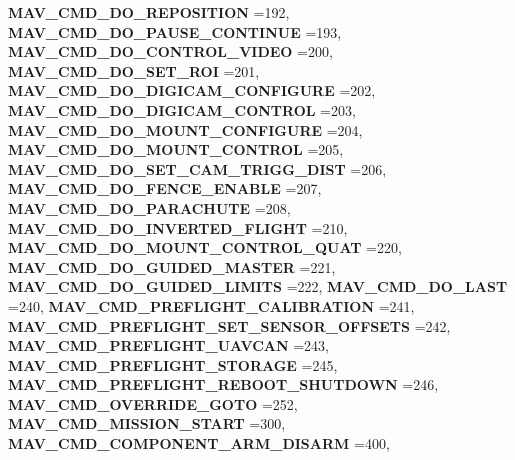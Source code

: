 \begin{DoxyCompactItemize}
\textbf{ M\+A\+V\+\_\+\+C\+M\+D\+\_\+\+D\+O\+\_\+\+R\+E\+P\+O\+S\+I\+T\+I\+ON} =192, 
\newline
\textbf{ M\+A\+V\+\_\+\+C\+M\+D\+\_\+\+D\+O\+\_\+\+P\+A\+U\+S\+E\+\_\+\+C\+O\+N\+T\+I\+N\+UE} =193, 
\textbf{ M\+A\+V\+\_\+\+C\+M\+D\+\_\+\+D\+O\+\_\+\+C\+O\+N\+T\+R\+O\+L\+\_\+\+V\+I\+D\+EO} =200, 
\textbf{ M\+A\+V\+\_\+\+C\+M\+D\+\_\+\+D\+O\+\_\+\+S\+E\+T\+\_\+\+R\+OI} =201, 
\textbf{ M\+A\+V\+\_\+\+C\+M\+D\+\_\+\+D\+O\+\_\+\+D\+I\+G\+I\+C\+A\+M\+\_\+\+C\+O\+N\+F\+I\+G\+U\+RE} =202, 
\newline
\textbf{ M\+A\+V\+\_\+\+C\+M\+D\+\_\+\+D\+O\+\_\+\+D\+I\+G\+I\+C\+A\+M\+\_\+\+C\+O\+N\+T\+R\+OL} =203, 
\textbf{ M\+A\+V\+\_\+\+C\+M\+D\+\_\+\+D\+O\+\_\+\+M\+O\+U\+N\+T\+\_\+\+C\+O\+N\+F\+I\+G\+U\+RE} =204, 
\textbf{ M\+A\+V\+\_\+\+C\+M\+D\+\_\+\+D\+O\+\_\+\+M\+O\+U\+N\+T\+\_\+\+C\+O\+N\+T\+R\+OL} =205, 
\textbf{ M\+A\+V\+\_\+\+C\+M\+D\+\_\+\+D\+O\+\_\+\+S\+E\+T\+\_\+\+C\+A\+M\+\_\+\+T\+R\+I\+G\+G\+\_\+\+D\+I\+ST} =206, 
\newline
\textbf{ M\+A\+V\+\_\+\+C\+M\+D\+\_\+\+D\+O\+\_\+\+F\+E\+N\+C\+E\+\_\+\+E\+N\+A\+B\+LE} =207, 
\textbf{ M\+A\+V\+\_\+\+C\+M\+D\+\_\+\+D\+O\+\_\+\+P\+A\+R\+A\+C\+H\+U\+TE} =208, 
\textbf{ M\+A\+V\+\_\+\+C\+M\+D\+\_\+\+D\+O\+\_\+\+I\+N\+V\+E\+R\+T\+E\+D\+\_\+\+F\+L\+I\+G\+HT} =210, 
\textbf{ M\+A\+V\+\_\+\+C\+M\+D\+\_\+\+D\+O\+\_\+\+M\+O\+U\+N\+T\+\_\+\+C\+O\+N\+T\+R\+O\+L\+\_\+\+Q\+U\+AT} =220, 
\newline
\textbf{ M\+A\+V\+\_\+\+C\+M\+D\+\_\+\+D\+O\+\_\+\+G\+U\+I\+D\+E\+D\+\_\+\+M\+A\+S\+T\+ER} =221, 
\textbf{ M\+A\+V\+\_\+\+C\+M\+D\+\_\+\+D\+O\+\_\+\+G\+U\+I\+D\+E\+D\+\_\+\+L\+I\+M\+I\+TS} =222, 
\textbf{ M\+A\+V\+\_\+\+C\+M\+D\+\_\+\+D\+O\+\_\+\+L\+A\+ST} =240, 
\textbf{ M\+A\+V\+\_\+\+C\+M\+D\+\_\+\+P\+R\+E\+F\+L\+I\+G\+H\+T\+\_\+\+C\+A\+L\+I\+B\+R\+A\+T\+I\+ON} =241, 
\newline
\textbf{ M\+A\+V\+\_\+\+C\+M\+D\+\_\+\+P\+R\+E\+F\+L\+I\+G\+H\+T\+\_\+\+S\+E\+T\+\_\+\+S\+E\+N\+S\+O\+R\+\_\+\+O\+F\+F\+S\+E\+TS} =242, 
\textbf{ M\+A\+V\+\_\+\+C\+M\+D\+\_\+\+P\+R\+E\+F\+L\+I\+G\+H\+T\+\_\+\+U\+A\+V\+C\+AN} =243, 
\textbf{ M\+A\+V\+\_\+\+C\+M\+D\+\_\+\+P\+R\+E\+F\+L\+I\+G\+H\+T\+\_\+\+S\+T\+O\+R\+A\+GE} =245, 
\textbf{ M\+A\+V\+\_\+\+C\+M\+D\+\_\+\+P\+R\+E\+F\+L\+I\+G\+H\+T\+\_\+\+R\+E\+B\+O\+O\+T\+\_\+\+S\+H\+U\+T\+D\+O\+WN} =246, 
\newline
\textbf{ M\+A\+V\+\_\+\+C\+M\+D\+\_\+\+O\+V\+E\+R\+R\+I\+D\+E\+\_\+\+G\+O\+TO} =252, 
\textbf{ M\+A\+V\+\_\+\+C\+M\+D\+\_\+\+M\+I\+S\+S\+I\+O\+N\+\_\+\+S\+T\+A\+RT} =300, 
\textbf{ M\+A\+V\+\_\+\+C\+M\+D\+\_\+\+C\+O\+M\+P\+O\+N\+E\+N\+T\+\_\+\+A\+R\+M\+\_\+\+D\+I\+S\+A\+RM} =400, 

\end{DoxyCompactItemize}
